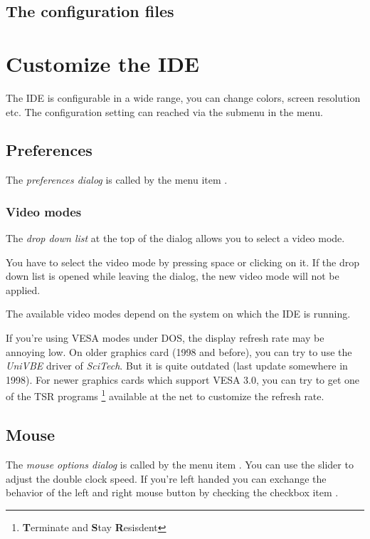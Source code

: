 \subsection{The configuration files}

\section{Customize the IDE}
The IDE is configurable in a wide range, you can change colors, screen
resolution etc. The configuration setting can reached via the
submenu  in the  menu.

\subsection{Preferences}
The \emph{preferences dialog} is called by the menu item
.


\subsubsection{Video modes}
The \emph{drop down list} at the top of the dialog allows you
to select a video mode.

\begin{remark}
You have to select the video mode by pressing space or clicking
on it. If the drop down list is opened while leaving the dialog,
the new video mode will not be applied.
\end{remark}

The available video modes depend on the system on which the IDE
is running. 

\begin{remark}
If you're using VESA modes under DOS, the display refresh rate may be
annoying low. On older graphics card (1998 and before),
you can try to use the \emph{UniVBE} driver of \emph{SciTech}. But
it is quite outdated (last update somewhere in 1998). For newer
graphics cards which support VESA 3.0, you can try to get one
of the TSR programs
\footnote{\textbf{T}erminate and \textbf{S}tay \textbf{R}esisdent}
available at the net to customize the refresh rate.
\end{remark}

\subsection{Mouse}
\label{se:prefmouse}
The \emph{mouse options dialog} is called by the menu item
. You can use the slider to adjust the
double clock speed. If you're left handed you can exchange the
behavior of the left and right mouse button by checking the checkbox
item .


